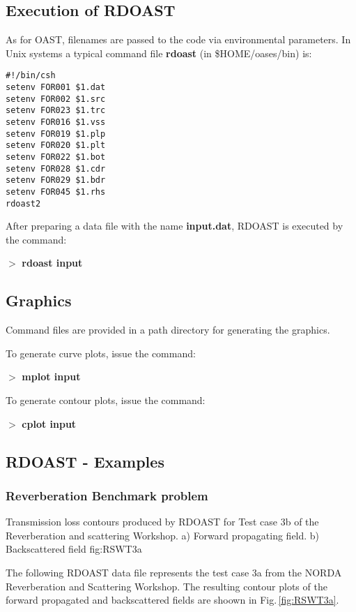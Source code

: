 \subsection{Execution of RDOAST}

    As  for  OAST,  filenames  are  passed  to  the  code   via 
environmental parameters. In Unix systems a typical command  file 
{\bf rdoast} (in  \$HOME/oases/bin) is:

\small
\begin{verbatim}
#!/bin/csh
setenv FOR001 $1.dat
setenv FOR002 $1.src
setenv FOR023 $1.trc
setenv FOR016 $1.vss
setenv FOR019 $1.plp
setenv FOR020 $1.plt
setenv FOR022 $1.bot
setenv FOR028 $1.cdr
setenv FOR029 $1.bdr
setenv FOR045 $1.rhs
rdoast2
\end{verbatim}
\normalsize

    After preparing a data file with the name {\bf input.dat}, RDOAST  is 
executed by the command:

    $>$ {\bf rdoast input}

\subsection{Graphics}  

    Command files are provided in a path directory for generating 
the graphics.

\noindent    To generate curve plots, issue the command:

    $>$ {\bf mplot input}

\noindent    To generate contour plots, issue the command:

    $>$ {\bf cplot input}

\newpage
\subsection{RDOAST - Examples}

\subsubsection{Reverberation Benchmark problem}

{Transmission loss contours produced by RDOAST for Test case 3b of the
Reverberation and scattering Workshop. a) Forward propagating
field. b) Backscattered field}
{fig:RSWT3a}

The following RDOAST data file represents the test case 3a from the
NORDA Reverberation and Scattering Workshop. The resulting contour
plots of the forward propagated and backscattered fields are shoown in
Fig.\,\ref{fig:RSWT3a}.

